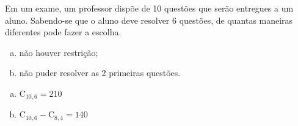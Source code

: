 \begin{ex}
Em um exame, um professor dispõe de 10 questões que serão entregues a um aluno. Sabendo-se que o aluno deve resolver 6 questões, de quantas  maneiras diferentes pode fazer a escolha.
   \begin{enumerate} [(a)]
   \item não houver restrição;
   \item não puder resolver  as 2 primeiras questões.
   \end{enumerate}
     \begin{sol}
      \phantom{A}
       \begin{enumerate} [(a)]
           \item $\mathrm{C}_{{10},6}=210$
           \item $\mathrm{C}_{{10},6}-\mathrm{C}_{8,4}=140$
       \end{enumerate}
     \end{sol}
\end{ex}